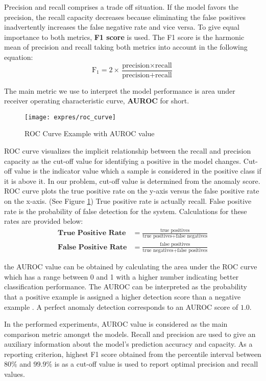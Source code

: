 Precision and recall comprises a trade off situation. If the model favors the precision, the recall
capacity decreases because eliminating the false positives inadvertently increases the false
negative rate and vice versa. To give equal importance to both metrics, \textbf{F1 score} is used.
The F1 score is the harmonic mean of precision and recall taking both metrics into account in the
following equation:
\begin{equation}
\text{F}_{1} = 2 \times \frac{\text{precision} \times \text{recall}}{\text{precision} + \text{recall}}
\end{equation}

The main metric we use to interpret the model performance is area under receiver operating
characteristic curve, \textbf{AUROC} for short. 
\begin{figure}[h!]%
	\centering
	\texttt{[image: expres/roc\_curve]}
	\caption{ROC Curve Example with AUROC value}
	\label{fig:roc_curve}%
\end{figure}
ROC curve visualizes the implicit relationship between the recall and precision capacity as the
cut-off value for identifying a positive in the model changes. Cut-off value is the indicator value
which a sample is considered in the positive class if it is above it. In our problem, cut-off value
is determined from the anomaly score. ROC curve plots the true positive rate on the y-axis versus
the false positive rate on the x-axis. (See Figure \ref{fig:roc_curve}) True positive rate is
actually recall. False positive rate is the probability of false detection for the system.
Calculations for these rates are provided below:
\begin{align}
\textbf{True Positive Rate} & = \frac{\text{true positives}}{\text{true positives} + \text{false negatives}} \\[5pt]
\textbf{False Positive Rate} & = \frac{\text{false positives}}{\text{true negatives} + \text{false positives}}
\end{align}

the AUROC value can be obtained by calculating the area under the ROC curve which has a range
between 0 and 1 with a higher number indicating better classification performance. The AUROC can be
interpreted as the probability that a positive example is assigned a higher detection score than a
negative example \cite{Fawcett:2006:IRA:1159473.1159475}. A perfect anomaly detection corresponds to
an AUROC score of $1.0$.

In the performed experiments, AUROC value is considered as the main comparison metric amongst the
models. Recall and precision are used to give an auxiliary information about the model's prediction
accuracy and capacity. As a reporting criterion, highest F1 score obtained from the percentile
interval between $80\%$ and $99.9\%$ is as a cut-off value is used to report optimal precision and
recall values. 

